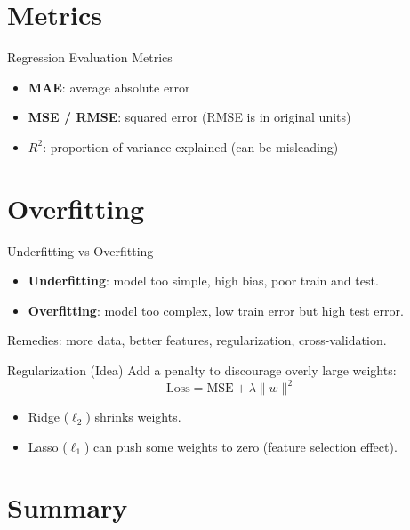 \documentclass[aspectratio=169]{beamer}
\begin{document}
\section{Metrics}
\label{sec:metrics}

\begin{frame}{Regression Evaluation Metrics}
  \begin{itemize}[<+->]
    \item \textbf{MAE}: average absolute error
    \item \textbf{MSE / RMSE}: squared error (RMSE is in original units)
    \item \textbf{$R^2$}: proportion of variance explained (can be misleading)
  \end{itemize}
\end{frame}

\section{Overfitting}
\label{sec:overfit}

\begin{frame}{Underfitting vs Overfitting}
  \begin{itemize}[<+->]
    \item \textbf{Underfitting}: model too simple, high bias, poor train and test.
    \item \textbf{Overfitting}: model too complex, low train error but high test error.
  \end{itemize}
  \vspace{0.4em}
  Remedies: more data, better features, regularization, cross-validation.
\end{frame}

\begin{frame}{Regularization (Idea)}
  Add a penalty to discourage overly large weights:
  \[
    \text{Loss} = \text{MSE} + \lambda \|w\|^2
  \]
  \begin{itemize}[<+->]
    \item Ridge ($\ell_2$) shrinks weights.
    \item Lasso ($\ell_1$) can push some weights to zero (feature selection effect).
  \end{itemize}
\end{frame}

\section{Summary}
\label{sec:summary}
\end{document}
